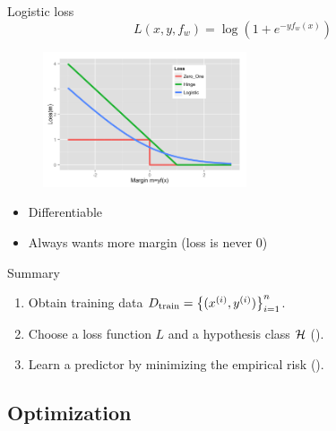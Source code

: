 \documentclass[usenames,dvipsnames,notes,11pt,aspectratio=169]{beamer}
\begin{document}
\begin{frame}
    {Logistic loss}
    $$
    L(x,y,f_w) = \log(1+e^{-yf_w(x)})
    $$
    \begin{figure}
        \includegraphics[height=4cm]{figures/loss.Zero_One.Hinge.Logistic.png}
    \end{figure}
    \begin{itemize}
        \item Differentiable
        \item Always wants more margin (loss is never 0)
    \end{itemize}
\end{frame}

\begin{frame}
    {Summary}
    \begin{enumerate}
        \itemsep2em
        \item Obtain training data $D_{\text{train}}=\left\{ (x^{(i)}, y^{(i)}) \right\}_{i=1}^n$.
        \item Choose a loss function $L$ and a hypothesis class $\mathcal{H}$ ().
        \item Learn a predictor by minimizing the empirical risk ().
    \end{enumerate}
\end{frame}


\subsection{Optimization}

\end{document}

